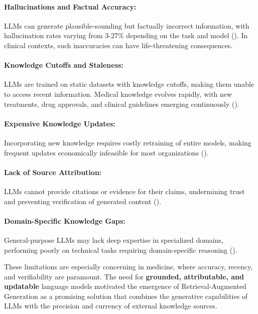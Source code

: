 \paragraph{Hallucinations and Factual Accuracy:} LLMs can generate plausible-sounding but factually incorrect information, with hallucination rates varying from 3-27\% depending on the task and model (\citep{zhang2023sirens}). In clinical contexts, such inaccuracies can have life-threatening consequences.

\paragraph{Knowledge Cutoffs and Staleness:} LLMs are trained on static datasets with knowledge cutoffs, making them unable to access recent information. Medical knowledge evolves rapidly, with new treatments, drug approvals, and clinical guidelines emerging continuously (\citep{rogers2023prompt}).

\paragraph{Expensive Knowledge Updates:} Incorporating new knowledge requires costly retraining of entire models, making frequent updates economically infeasible for most organizations (\citep{zhu2020modifying}).

\paragraph{Lack of Source Attribution:} LLMs cannot provide citations or evidence for their claims, undermining trust and preventing verification of generated content (\citep{rashkin2021measuring}).

\paragraph{Domain-Specific Knowledge Gaps:} General-purpose LLMs may lack deep expertise in specialized domains, performing poorly on technical tasks requiring domain-specific reasoning (\citep{hendrycks2021measuring}).

These limitations are especially concerning in medicine, where accuracy, recency, and verifiability are paramount. The need for \textbf{grounded, attributable, and updatable} language models motivated the emergence of Retrieval-Augmented Generation as a promising solution that combines the generative capabilities of LLMs with the precision and currency of external knowledge sources.

